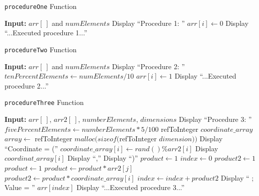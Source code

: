 \documentclass[10pt, conference]{IEEEtran}
\begin{document}
\begin{appendices}
\begin{algorithm}[h!]
\begin{algorithmic}
\end{algorithmic}
\end{algorithm}

\begin{algorithm}[h!]
\caption{\texttt{procedureOne} Function}
\label{procedureOne}
\begin{algorithmic} 

\STATE \textbf{Input:} $arr[\ ]$ and $numElements$
\STATE
\STATE Display ``Procedure 1: ''
	\STATE $arr[i] \leftarrow 0$
\ENDFOR
\STATE Display ``...Executed procedure 1...''

\end{algorithmic}
\end{algorithm}


\begin{algorithm}[h!]
\caption{\texttt{procedureTwo} Function}
\label{procedureTwo}
\begin{algorithmic} 

\STATE \textbf{Input:} $arr[\ ]$ and $numElements$
\STATE
\STATE Display ``Procedure 2: ''
\STATE $tenPercentElements \leftarrow numElements/10$
		\STATE $arr[i] \leftarrow 1$
	\ENDIF
\ENDFOR
\STATE Display ``...Executed procedure 2...''

\end{algorithmic}
\end{algorithm}

\begin{algorithm}[h!]
\caption{\texttt{procedureThree} Function}
\label{procedureThree}
\begin{algorithmic} 

\STATE \textbf{Input:} $arr[\ ]$, $arr2[\ ]$, $numberElements$, $dimensions$
\STATE
\STATE Display ``Procedure 3: ''
\STATE $fivePercentElements \leftarrow numberElements*5/100$
	\STATE refToInteger $coordinate\_array$
	\STATE $array \leftarrow$ refToInteger $malloc(sizeof($refToInteger $dimension))$	
	\STATE Display ``Coordinate = (''
		\STATE $coordinate\_array[i] \leftarrow rand()\%arr2[i]$
		\STATE Display $coordinat\_array[i]$
			\STATE Display ``,''
		\ENDIF
	\ENDFOR
	\STATE Display ``)''
	\STATE $product \leftarrow 1$
	\STATE $index \leftarrow 0$
	\STATE $product2 \leftarrow 1$
		\STATE $product \leftarrow 1$
			\STATE $product \leftarrow product * arr2[j]$
		\ENDFOR
		\STATE $product2 \leftarrow product*coordinate\_array[i]$
		\STATE $index \leftarrow index + product2$
	\ENDFOR
	\STATE Display `` ; Value = '' $arr[index]$
\ENDFOR
\STATE Display ``...Executed procedure 3...''


\end{algorithmic}
\end{algorithm}
\end{appendices}
\end{document}
